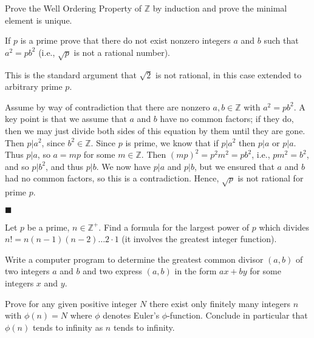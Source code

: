 \documentclass[12pt]{article}
\renewcommand{\qed}{\hfill$\blacksquare$}
\renewenvironment{proof}{\begin{addmargin}[1em]{0em}\begin{newproof}}{\end{newproof}\end{addmargin}\qed}
\newenvironment{problem}[2][Exercise]{\begin{trivlist}
\item[\hskip \labelsep {\bfseries #1}\hskip \labelsep {\bfseries #2.}]}{\end{trivlist}}
\begin{document}
\begin{problem}{0.2.6}
Prove the Well Ordering Property of $\mathbb{Z}$ by induction and prove the minimal element is unique.
\end{problem}


\begin{problem}{0.2.7}
If $p$ is a prime prove that there do not exist nonzero integers $a$ and $b$ such that $a^2=pb^2$ (i.e., $\sqrt{p}$ is not a rational number).
\end{problem}
\begin{proof}
This is the standard argument that $\sqrt{2}$ is not rational, in this case extended to arbitrary prime $p$.

Assume by way of contradiction that there are nonzero $a,b\in \mathbb{Z}$ with $a^2 = pb^2$. A key point is that we assume that $a$ and $b$ have no common factors; if they do, then we may just divide both sides of this equation by them until they are gone. Then $p|a^2$, since $b^2 \in \mathbb{Z}$. Since $p$ is prime, we know that if $p|a^2$ then $p|a$ or $p|a$. Thus $p|a$, so $a=mp$ for some $m\in \mathbb{Z}$. Then $\left(mp\right)^2 = p^2 m^2 = pb^2$, i.e., $pm^2 = b^2$, and so $p|b^2$, and thus $p|b$. We now have $p|a$ and $p|b$, but we ensured that $a$ and $b$ had no common factors, so this is a contradiction. Hence, $\sqrt{p}$ is not rational for prime $p$.
\end{proof}


\begin{problem}{0.2.8}
Let $p$ be a prime, $n\in \mathbb{Z}^+$. Find a formula for the largest power of $p$ which divides $n!=n\left(n-1\right)\left(n-2\right)\ldots 2\cdot 1$ (it involves the greatest integer function).
\end{problem}


\begin{problem}{0.2.9}
Write a computer program to determine the greatest common divisor $\left(a,b\right)$ of two integers $a$ and $b$ and two express $\left(a,b\right)$ in the form $ax+by$ for some integers $x$ and $y$.
\end{problem}


\begin{problem}{0.2.10}
Prove for any given positive integer $N$ there exist only finitely many integers $n$ with $\phi \left(n\right)=N$ where $\phi$ denotes Euler's $\phi$-function. Conclude in particular that $\phi\left(n\right)$ tends to infinity as $n$ tends to infinity.
\end{problem}
\end{document}
